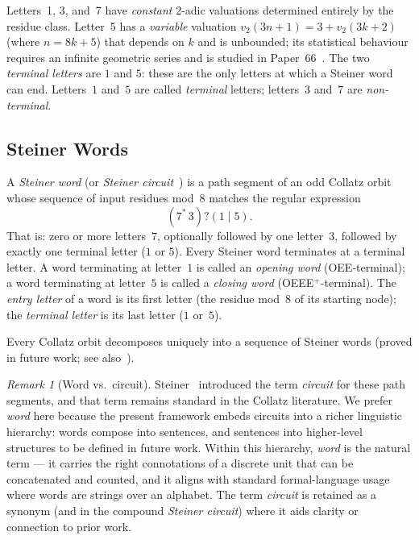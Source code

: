 \documentclass[12pt]{article}
\theoremstyle{definition}
\theoremstyle{remark}
\newtheorem{remark}[theorem]{Remark}
\begin{document}
Letters~1, 3, and~7 have \emph{constant} 2-adic valuations determined entirely
by the residue class.
Letter~5 has a \emph{variable} valuation $v_2(3n+1) = 3 + v_2(3k+2)$ (where
$n = 8k+5$) that depends on $k$ and is unbounded; its statistical behaviour
requires an infinite geometric series and is studied in Paper~66~\cite{paper66}.
The two \emph{terminal letters} are $1$ and $5$: these are the only letters at
which a Steiner word can end.
Letters~$1$ and~$5$ are called \emph{terminal} letters; letters~$3$ and~$7$ are
\emph{non-terminal}.

\subsection*{Steiner Words}

A \emph{Steiner word} (or \emph{Steiner circuit}~\cite{steiner}) is a
path segment of an odd Collatz orbit whose sequence of input residues mod~8
matches the regular expression
\[
  (7^*\,3)?(1 \mid 5).
\]
That is: zero or more letters~$7$, optionally followed by one letter~$3$,
followed by exactly one terminal letter ($1$ or $5$).
Every Steiner word terminates at a terminal letter.
A word terminating at letter~$1$ is called an \emph{opening word}
(OEE-terminal); a word terminating at letter~$5$ is called a \emph{closing
word} (OEEE$^+$-terminal).
The \emph{entry letter} of a word is its first letter (the residue mod~8 of
its starting node); the \emph{terminal letter} is its last letter ($1$ or~$5$).

Every Collatz orbit decomposes uniquely into a sequence of Steiner words
(proved in future work; see also~\cite{steiner}).

\begin{remark}[Word vs.\ circuit]
Steiner~\cite{steiner} introduced the term \emph{circuit} for these path
segments, and that term remains standard in the Collatz literature.
We prefer \emph{word} here because the present framework embeds circuits into
a richer linguistic hierarchy: words compose into sentences, and sentences into
higher-level structures to be defined in future work.
Within this hierarchy, \emph{word} is the natural term — it carries the right
connotations of a discrete unit that can be concatenated and counted, and it
aligns with standard formal-language usage where words are strings over an
alphabet.
The term \emph{circuit} is retained as a synonym (and in the compound
\emph{Steiner circuit}) where it aids clarity or connection to prior work.
\end{remark}
\end{document}
